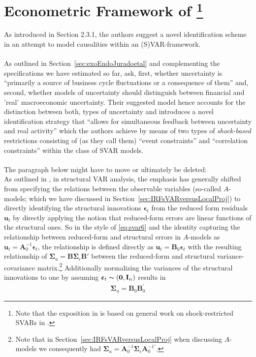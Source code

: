 \documentclass[a4paper,11pt,listof=nochaptergap,oneside,pointednumbers,bibtotoc,bigheadings,liststotoc]{scrbook}
\theoremstyle{mysatz}
\theoremstyle{mydefinition}
\theoremstyle{mybemerkung}
\newcommand{\vect}[1]{\boldsymbol{\mathbf{#1}}}
\begin{document}
\section[Econometric Framework of \citet{ludvigsonetal:18}]{Econometric Framework of \citet{ludvigsonetal:18}\footnote{Note that the exposition in \citet{ludvigsonetal:18} is based on general work on shock-restricted SVARs in \citet{ludvigsonetal:17}.}}

As introduced in Section 2.3.1, the authors suggest a novel identification scheme in an attempt to model causalities within an (S)VAR-framework.\\
\\
As outlined in Section~\ref{sec:exoEndoJuradoetal} and complementing the specifications we have estimated so far, \citet[p. 2]{ludvigsonetal:18} ask, first, whether uncertainty is ``primarily a source of business cycle fluctuations or a consequence of them'' and, second, whether models of uncertainty should distinguish between financial and 'real' macroeconomic uncertainty. Their suggested model hence accounts for the distinction between both, types of uncertainty and introduces a novel identification strategy that ``allows for simultaneous feedback between uncertainty and real activity'' which the authors achieve by means of two types of \textit{shock-based} restrictions consisting of (as they call them) ``event constraints'' and ``correlation constraints'' within the class of SVAR models.\\
\\
The paragraph below might have to move or ultimately be deleted:\\
As outlined in \citet{lutkepohl:05}, in structural VAR analysis, the emphasis has generally shifted from specifying the relations between the observable variables (so-called $A$-models; which we have discussed in Section~\ref{sec:IRFsVARversusLocalProj}) to directly identifying the structural innovations $\vect{\epsilon}_t$ from the reduced form residuals $\vect{u}_t$ by directly applying the notion that reduced-form errors are linear functions of the structural ones. So in the style of \ref{eq:svar6} and the identity capturing the relationship between reduced-form and structural errors in $A$-models as $\vect{u}_t = \vect{A}_0^{-1}\vect{\epsilon}_t$, the relationship is defined directly as $\vect{u}_t = \vect{B}_0\vect{\epsilon}_t$ with the resulting relationship of $\vect{\Sigma}_u = \vect{B}\vect{\Sigma}_\epsilon\vect{B}'$ between the reduced-form and structural variance-covariance matrix.\footnote{Note that in Section~\ref{sec:IRFsVARversusLocalProj} when discussing $A$-models we consequently had $\vect{\Sigma}_u = \vect{A}_0^{-1}\vect{\Sigma}_\epsilon\vect{A}_0^{-1'}$.} Additionally normalizing the variances of the structural innovations to one by assuming $\vect{\epsilon}_t  \thicksim (\vect{0}, \vect{I}_n)$ results in 
	\begin{equation} \label{eq:svar_ludvig2}
	\begin{split}
		\vect{\Sigma}_u = \vect{B}_0 \vect{B}_0^'
	\end{split}
	\end{equation}
	
\end{document}
